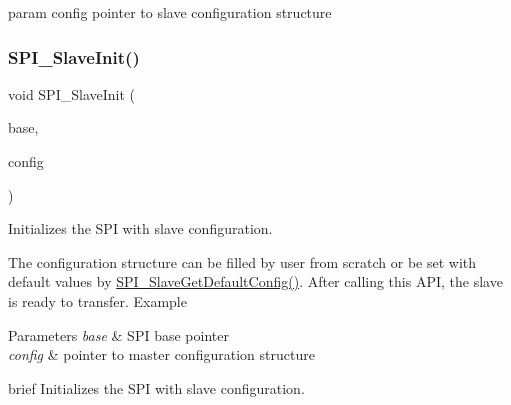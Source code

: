 param config pointer to slave configuration structure \mbox{\label{group__spi__driver_ga91b214b5392fc8d5b73a5ebadc5ca363}} 
\subsubsection{\texorpdfstring{SPI\_SlaveInit()}{SPI\_SlaveInit()}}
{\footnotesize\ttfamily void S\+P\+I\+\_\+\+Slave\+Init (\begin{DoxyParamCaption}\item[{\mbox{\hyperlink{struct_s_p_i___type}{S\+P\+I\+\_\+\+Type}} $\ast$}]{base,  }\item[{const \mbox{\hyperlink{group__spi__driver_gaa62352a5d0a01f70fe74941809d03ec3}{spi\+\_\+slave\+\_\+config\+\_\+t}} $\ast$}]{config }\end{DoxyParamCaption})}



Initializes the S\+PI with slave configuration. 

The configuration structure can be filled by user from scratch or be set with default values by \mbox{\hyperlink{group__spi__driver_gac000b63ed033f57a9eee342a8c8e67f2}{S\+P\+I\+\_\+\+Slave\+Get\+Default\+Config()}}. After calling this A\+PI, the slave is ready to transfer. Example 
\begin{DoxyCode}{0}
\DoxyCodeLine{\};}
\end{DoxyCode}



\begin{DoxyParams}{Parameters}
{\em base} & S\+PI base pointer \\
\hline
{\em config} & pointer to master configuration structure\\
\hline
\end{DoxyParams}
brief Initializes the S\+PI with slave configuration.


